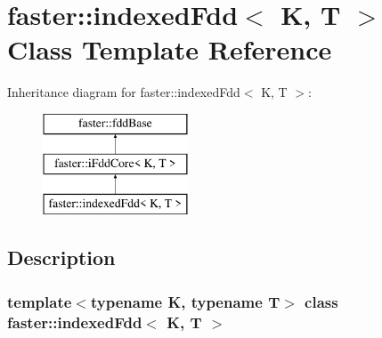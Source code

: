 \hypertarget{classfaster_1_1indexedFdd}{}\section{faster\+:\+:indexed\+Fdd$<$ K, T $>$ Class Template Reference}
\label{classfaster_1_1indexedFdd}
Inheritance diagram for faster\+:\+:indexed\+Fdd$<$ K, T $>$\+:\begin{figure}[H]
\begin{center}
\leavevmode
\includegraphics[height=3.000000cm]{classfaster_1_1indexedFdd}
\end{center}
\end{figure}


\subsection{Description}
\subsubsection*{template$<$typename K, typename T$>$\newline
class faster\+::indexed\+Fdd$<$ K, T $>$}

